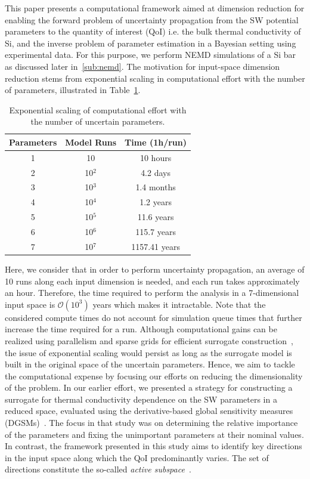This paper presents a computational framework aimed at dimension reduction
for enabling the forward problem of uncertainty propagation from the SW potential 
parameters to the quantity of interest (QoI) i.e. the bulk thermal conductivity of Si,
and the inverse problem of parameter estimation in a Bayesian setting using 
experimental data. For this purpose, we perform NEMD simulations of a Si bar
as discussed later in~\ref{sub:nemd}. The
motivation for input-space dimension reduction stems from exponential scaling in
computational effort with the number of parameters, illustrated in Table~\ref{tab:effort}. 
%
\newcommand{\ra}[1]{\renewcommand{\arraystretch}{#1}}
\begin{table}[htbp]
\centering
\ra{1.3}
\begin{tabular}{@{}ccc@{}}\toprule
Parameters & Model Runs & Time (1h/run)\\
\bottomrule
1 & 10 & 10 hours \\
2 & 10$^2$ & 4.2 days \\
3 & 10$^3$ & 1.4 months \\
4 & 10$^4$ & 1.2 years \\
5 & 10$^5$ & 11.6 years \\
6 & 10$^6$ & 115.7 years \\
7 & 10$^7$ & 1157.41 years \\
\bottomrule
\end{tabular}
\caption{Exponential scaling of computational effort with the number of uncertain parameters.}
\label{tab:effort}
\end{table}
%
Here, we consider that in order to perform uncertainty propagation,
an average of 10 runs along each input dimension
is needed, and each run takes approximately an hour. Therefore, the time required to 
perform the analysis in a 7-dimensional input space is $\mathcal{O}(10^3)$ years which makes it
intractable. Note that the considered compute times do not account for simulation queue times that further 
increase the time required for a run. 
Although computational gains can be realized using parallelism and sparse grids
for efficient surrogate construction~\cite{Bichon:2008,Ma:2009,Constantine:2012,Petvipusit:2014,Vohra:2014,Hu:2016}, 
the issue of exponential scaling would persist as long as the surrogate model is built in the original space of
the uncertain parameters.  
Hence, we aim to tackle the computational expense by focusing our efforts on reducing the 
dimensionality of the problem.
In our earlier effort, we presented a strategy
for constructing a surrogate for thermal conductivity dependence on the SW parameters
in a reduced space, evaluated using the derivative-based global sensitivity measures
(DGSMs)~\cite{Vohra:2018a}. The focus in that study was on determining the relative importance of the
parameters and fixing the unimportant parameters at their nominal values. In contrast, the
framework presented in this study aims to identify key directions in the input space along which the
QoI predominantly varies. The set of directions constitute the so-called 
\textit{active subspace}~\cite{Constantine:2015}.  

